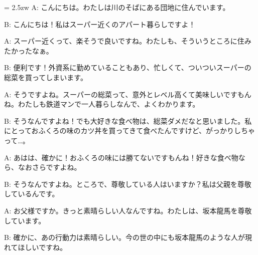 \documentclass[11pt]{amsart}
\title{}
\author{}
\newenvironment{hangall}[1]{\hangindent = 2.5zw\everypar{\hangindent = 2.5zw}}{}
\begin{document}
\maketitle
\begin{hangall}{}%
A: こんにちは。わたしは川のそばにある団地に住んでいます。



B: こんにちは！私はスーパー近くのアパート暮らしですよ！



A: スーパー近くって、楽そうで良いですね。わたしも、そういうところに住みたかったなぁ。



B: 便利です！外資系に勤めていることもあり、忙しくて、ついついスーパーの総菜を買ってしまいます。



A: そうですよね。スーパーの総菜って、意外とレベル高くて美味しいですもんね。わたしも鉄道マンで一人暮らしなんで、よくわかります。



B: そうなんですよね！でも大好きな食べ物は、総菜ダメだなと思いました。私にとっておふくろの味のカツ丼を買ってきて食べたんですけど、がっかりしちゃって…。



A: あはは、確かに！おふくろの味には勝てないですもんね！好きな食べ物なら、なおさらですよね。



B: そうなんですよね。ところで、尊敬している人はいますか？私は父親を尊敬しているんです。



A: お父様ですか。きっと素晴らしい人なんですね。わたしは、坂本龍馬を尊敬しています。



B: 確かに、あの行動力は素晴らしい。今の世の中にも坂本龍馬のような人が現れてほしいですね。\end{hangall}
\end{document}
